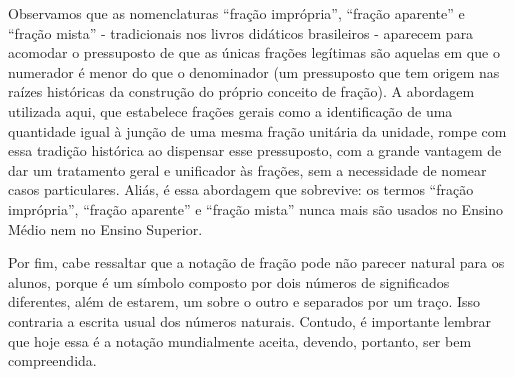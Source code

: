 Observamos que as nomenclaturas ``fração imprópria'', ``fração aparente'' e ``fração mista'' - tradicionais nos livros didáticos brasileiros - aparecem para acomodar o pressuposto de que as únicas frações legítimas são aquelas em que o numerador é menor do que o denominador (um pressuposto que tem origem nas raízes históricas da construção do próprio conceito de fração).
A abordagem utilizada aqui, que estabelece frações gerais como a identificação de uma quantidade igual à junção de uma mesma fração unitária da unidade, rompe com essa tradição histórica ao dispensar esse pressuposto, com a grande vantagem de dar um tratamento geral e unificador às frações, sem a necessidade de nomear casos particulares.
Aliás, é essa abordagem que sobrevive: os termos ``fração imprópria'', ``fração aparente'' e ``fração mista'' nunca mais são usados no Ensino Médio nem no Ensino Superior.

Por fim, cabe ressaltar que a notação de fração pode não parecer natural para os alunos, porque é um símbolo composto por dois números de significados diferentes, além de estarem, um sobre o outro e separados por um traço. Isso contraria a escrita usual dos números naturais. Contudo, é importante lembrar que hoje essa é a notação mundialmente aceita, devendo, portanto, ser bem compreendida.


\anotacoes

